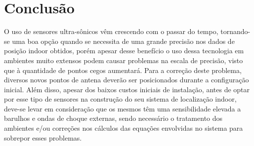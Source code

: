 \chapter{Conclusão}
\label{chap:conc}

O uso de sensores ultra-sônicos vêm crescendo com o passar do tempo, tornando-se uma boa opção quando se necessita de uma grande precisão nos dados de posição indoor obtidos, porém apesar desse benefício o uso dessa tecnologia em ambientes muito extensos podem causar problemas na escala de precisão, visto que à quantidade de pontos cegos aumentará. Para a correção deste problema, diversos novos pontos de antena deverão ser posicionados durante a configuração inicial. Além disso, apesar dos baixos custos iniciais de instalação, antes de optar por esse tipo de sensores na construção do seu sistema de localização indoor, deve-se levar em consideração que os mesmos têm uma sensibilidade elevada a barulhos e ondas de choque externas, sendo necessário o tratamento dos ambientes e/ou correções nos cálculos das equações envolvidas no sistema para sobrepor esses problemas.




